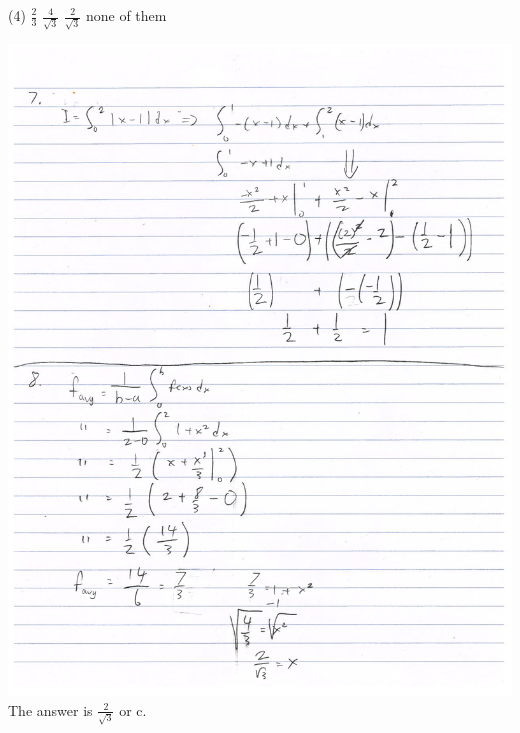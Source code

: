 \documentclass[MATH-115-Notes.tex]{subfiles}
\begin{document}
\begin{enumerate}[itemsep=5mm]
        \begin{tasks}(4)
            \task \(\frac{2}{3}\)
            \task \(\frac{4}{\sqrt{3}}\)
            \task \(\frac{2}{\sqrt{3}}\)
            \task none of them
        \end{tasks}
        {\centering\includegraphics[trim={0 0 0 55cm},clip,scale=0.15]{./figures/output-1.png}\\}
        The answer is $\frac{2}{\sqrt{3}}$ or c.
\end{enumerate}
\end{document}

